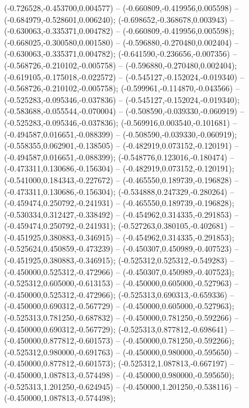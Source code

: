  (-0.726528,-0.453700,0.004577) -- (-0.660809,-0.419956,0.005598) -- (-0.684979,-0.528601,0.006240);
 (-0.698652,-0.368678,0.003943) -- (-0.630063,-0.335371,0.004782) -- (-0.660809,-0.419956,0.005598);
 (-0.668025,-0.300580,0.001580) -- (-0.596880,-0.270480,0.002404) -- (-0.630063,-0.335371,0.004782);
 (-0.641590,-0.236656,-0.007356) -- (-0.568726,-0.210102,-0.005758) -- (-0.596880,-0.270480,0.002404);
 (-0.619105,-0.175018,-0.022572) -- (-0.545127,-0.152024,-0.019340) -- (-0.568726,-0.210102,-0.005758);
 (-0.599961,-0.114870,-0.043566) -- (-0.525283,-0.095346,-0.037836) -- (-0.545127,-0.152024,-0.019340);
 (-0.583688,-0.055544,-0.070004) -- (-0.508590,-0.039330,-0.060919) -- (-0.525283,-0.095346,-0.037836);
 (-0.569916,0.003540,-0.101681) -- (-0.494587,0.016651,-0.088399) -- (-0.508590,-0.039330,-0.060919);
 (-0.558355,0.062901,-0.138505) -- (-0.482919,0.073152,-0.120191) -- (-0.494587,0.016651,-0.088399);
 (-0.548776,0.123016,-0.180474) -- (-0.473311,0.130686,-0.156304) -- (-0.482919,0.073152,-0.120191);
 (-0.541000,0.184343,-0.227672) -- (-0.465550,0.189739,-0.196828) -- (-0.473311,0.130686,-0.156304);
 (-0.534888,0.247329,-0.280264) -- (-0.459474,0.250792,-0.241931) -- (-0.465550,0.189739,-0.196828);
 (-0.530334,0.312427,-0.338492) -- (-0.454962,0.314335,-0.291853) -- (-0.459474,0.250792,-0.241931);
 (-0.527263,0.380105,-0.402681) -- (-0.451925,0.380883,-0.346915) -- (-0.454962,0.314335,-0.291853);
 (-0.525624,0.450859,-0.473239) -- (-0.450307,0.450989,-0.407523) -- (-0.451925,0.380883,-0.346915);
 (-0.525312,0.525312,-0.549283) -- (-0.450000,0.525312,-0.472966) -- (-0.450307,0.450989,-0.407523);
 (-0.525312,0.605000,-0.613153) -- (-0.450000,0.605000,-0.527963) -- (-0.450000,0.525312,-0.472966);
 (-0.525313,0.690313,-0.659336) -- (-0.450000,0.690312,-0.567729) -- (-0.450000,0.605000,-0.527963);
 (-0.525313,0.781250,-0.687832) -- (-0.450000,0.781250,-0.592266) -- (-0.450000,0.690312,-0.567729);
 (-0.525313,0.877812,-0.698641) -- (-0.450000,0.877812,-0.601573) -- (-0.450000,0.781250,-0.592266);
 (-0.525312,0.980000,-0.691763) -- (-0.450000,0.980000,-0.595650) -- (-0.450000,0.877812,-0.601573);
 (-0.525312,1.087813,-0.667197) -- (-0.450000,1.087813,-0.574498) -- (-0.450000,0.980000,-0.595650);
 (-0.525313,1.201250,-0.624945) -- (-0.450000,1.201250,-0.538116) -- (-0.450000,1.087813,-0.574498);
